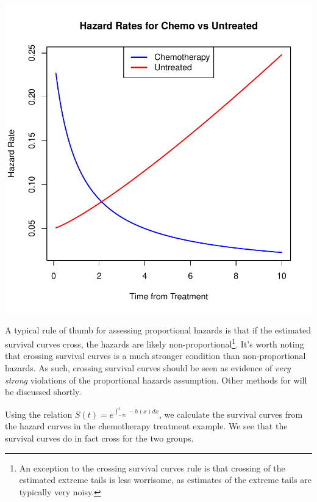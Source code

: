 \documentclass[a4paper]{article}
\begin{document}
\includegraphics{StatisticalBackground-006}
    
    A typical rule of thumb for assessing proportional hazards is that if the estimated survival curves cross, the hazards are likely non-proportional\footnote{An exception to the crossing survival curves rule is that crossing of the estimated extreme tails is less worrisome, as estimates of the extreme tails are typically very noisy.}. It's worth noting that crossing survival curves is a much stronger condition than non-proportional hazards. As such, crossing survival curves should be seen as evidence of \emph{very strong} violations of the proportional hazards assumption. Other methods for will be discussed shortly. 
    
    Using the relation 
    $S(t) = e^{\int_{-\infty}^t -h(x) dx }$,
    we calculate the survival curves from the hazard curves in the chemotherapy treatment example. We see that the survival curves do in fact cross for the two groups. 
    
\end{document}
